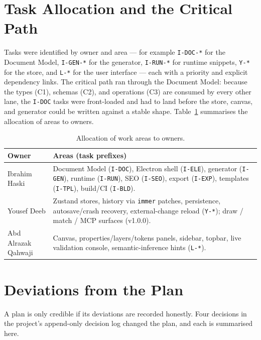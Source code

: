 \section{Task Allocation and the Critical Path}
Tasks were identified by owner and area --- for example \texttt{I-DOC-*} for the
Document Model, \texttt{I-GEN-*} for the generator, \texttt{I-RUN-*} for runtime
snippets, \texttt{Y-*} for the store, and \texttt{L-*} for the user interface ---
each with a priority and explicit dependency links. The critical path ran through
the Document Model: because the types (C1), schemas (C2), and operations (C3) are
consumed by every other lane, the \texttt{I-DOC} tasks were front-loaded and had to
land before the store, canvas, and generator could be written against a stable
shape. Table~\ref{tab:allocation} summarises the allocation of areas to owners.

\begin{table}[H]
  \centering
  \caption{Allocation of work areas to owners.}
  \label{tab:allocation}
  \small
  \begin{tabularx}{\linewidth}{@{}l X@{}}
    \toprule
    \textbf{Owner} & \textbf{Areas (task prefixes)} \\
    \midrule
    Ibrahim Haski      & Document Model (\texttt{I-DOC}), Electron shell (\texttt{I-ELE}), generator (\texttt{I-GEN}), runtime (\texttt{I-RUN}), SEO (\texttt{I-SEO}), export (\texttt{I-EXP}), templates (\texttt{I-TPL}), build/CI (\texttt{I-BLD}). \\
    Yousef Deeb        & Zustand stores, history via \texttt{immer} patches, persistence, autosave/crash recovery, external-change reload (\texttt{Y-*}); draw / match / MCP surfaces (v1.0.0). \\
    Abd Alrazak Qahwaji & Canvas, properties/layers/tokens panels, sidebar, topbar, live validation console, semantic-inference hints (\texttt{L-*}). \\
    \bottomrule
  \end{tabularx}
\end{table}

\section{Deviations from the Plan}
\label{sec:deviations}
A plan is only credible if its deviations are recorded honestly. Four decisions
in the project's append-only decision log changed the plan, and each is
summarised here.


